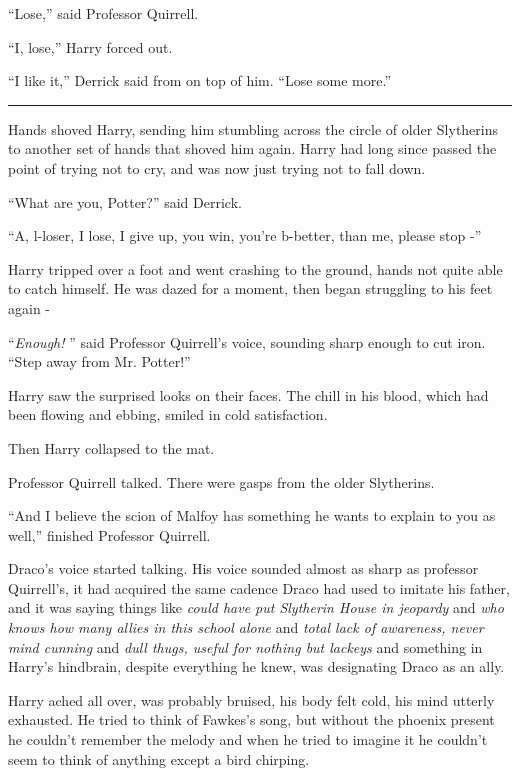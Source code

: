 ``Lose,'' said Professor Quirrell.

``I, lose,'' Harry forced out.

``I like it,'' Derrick said from on top of him. ``Lose some more.''

\begin{center}\rule{3in}{0.4pt}\end{center}

Hands shoved Harry, sending him stumbling across the circle of older
Slytherins to another set of hands that shoved him again. Harry had long
since passed the point of trying not to cry, and was now just trying not
to fall down.

``What are you, Potter?'' said Derrick.

``A, l-loser, I lose, I give up, you win, you're b-better, than me,
please stop -''

Harry tripped over a foot and went crashing to the ground, hands not
quite able to catch himself. He was dazed for a moment, then began
struggling to his feet again -

``\emph{Enough!} '' said Professor Quirrell's voice, sounding sharp enough
to cut iron. ``Step away from Mr. Potter!''

Harry saw the surprised looks on their faces. The chill in his blood,
which had been flowing and ebbing, smiled in cold satisfaction.

Then Harry collapsed to the mat.

Professor Quirrell talked. There were gasps from the older Slytherins.

``And I believe the scion of Malfoy has something he wants to explain to
you as well,'' finished Professor Quirrell.

Draco's voice started talking. His voice sounded almost as sharp as
professor Quirrell's, it had acquired the same cadence Draco had used to
imitate his father, and it was saying things like \emph{could have put
Slytherin House in jeopardy} and \emph{who knows how many allies in this
school alone} and \emph{total lack of awareness, never mind cunning} and
\emph{dull thugs, useful for nothing but lackeys} and something in
Harry's hindbrain, despite everything he knew, was designating Draco as
an ally.

Harry ached all over, was probably bruised, his body felt cold, his mind
utterly exhausted. He tried to think of Fawkes's song, but without the
phoenix present he couldn't remember the melody and when he tried to
imagine it he couldn't seem to think of anything except a bird chirping.

